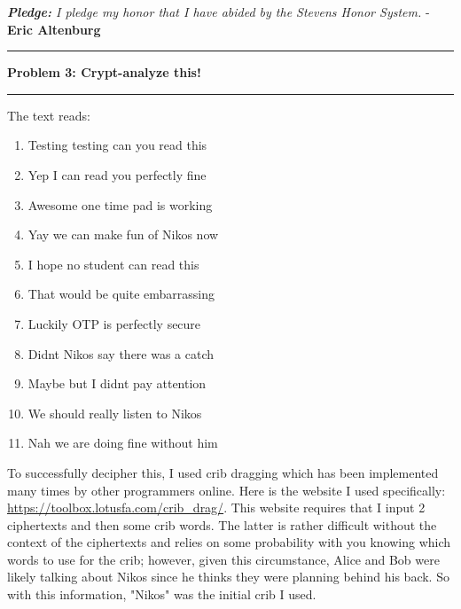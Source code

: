\documentclass[11pt]{article}
\newcommand\question[2]{\vspace{.25in}\hrule\textbf{#1: #2}\vspace{.5em}\hrule\vspace{.10in}}
\begin{document}
\newcommand\NAME{Eric Altenburg}  %
\newcommand\COURSE{CS-306}
\newcommand\HWNUM{1 \textit{Corrections}}              %
\newcommand{\bigO}{\mathcal{O}}


\begin{center}
	\textit{\textbf{Pledge:} I pledge my honor that I have abided by the Stevens Honor System.} - \textbf{\NAME}
\end{center}


\question{Problem 3}{Crypt-analyze this!}
	The text reads:
	\begin{enumerate}
		\item Testing testing can you read this
		\item Yep I can read you perfectly fine
		\item Awesome one time pad is working
		\item Yay we can make fun of Nikos now
		\item I hope no student can read this
		\item That would be quite embarrassing
		\item Luckily OTP is perfectly secure
		\item Didnt Nikos say there was a catch
		\item Maybe but I didnt pay attention
		\item We should really listen to Nikos
		\item Nah we are doing fine without him
	\end{enumerate}
	To successfully decipher this, I used crib dragging which has been implemented many times by other programmers online. Here is the website I used specifically: \href{https://toolbox.lotusfa.com/crib_drag/}{https://toolbox.lotusfa.com/crib\_drag/}. This website requires that I input 2 ciphertexts and then some crib words. The latter is rather difficult without the context of the ciphertexts and relies on some probability with you knowing which words to use for the crib; however, given this circumstance, Alice and Bob were likely talking about Nikos since he thinks they were planning behind his back. So with this information, "Nikos" was the initial crib I used. 
\end{document}
